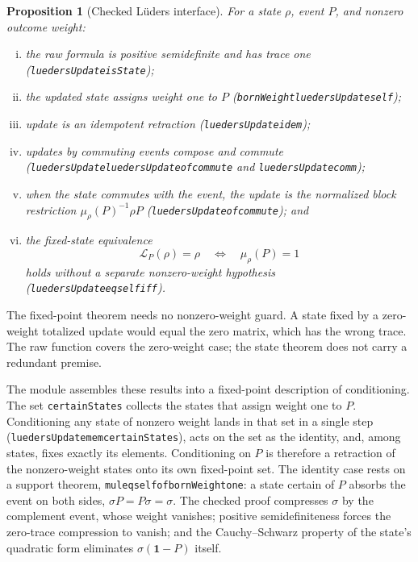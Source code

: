 \documentclass[11pt]{article}
\renewcommand{\_}{\textunderscore\allowbreak}
\newtheorem{proposition}{Proposition}
\theoremstyle{remark}
\newcommand{\one}{\mathbf 1}
\newcommand{\lued}{\mathcal L}
\begin{document}
\begin{proposition}[Checked L\"uders interface]
\label{prop:lueders}
For a state $\rho$, event $P$, and nonzero outcome weight:
\begin{enumerate}[(i)]
\item the raw formula is positive semidefinite and has trace one
(\texttt{luedersUpdate\_isState});
\item the updated state assigns weight one to $P$
(\texttt{bornWeight\_luedersUpdate\_self});
\item update is an idempotent retraction
(\texttt{luedersUpdate\_idem});
\item updates by commuting events compose and commute
(\texttt{luedersUpdate\_luedersUpdate\_of\_commute} and
\texttt{luedersUpdate\_comm});
\item when the state commutes with the event, the update is the normalized
block restriction $\mu_\rho(P)^{-1}\rho P$
(\texttt{luedersUpdate\_of\_commute}); and
\item the fixed-state equivalence
\[
  \lued_P(\rho)=\rho \quad\Longleftrightarrow\quad \mu_\rho(P)=1
\]
holds without a separate nonzero-weight hypothesis
(\texttt{luedersUpdate\_eq\_self\_iff}).
\end{enumerate}
\end{proposition}

The fixed-point theorem needs no nonzero-weight guard. A state fixed by a
zero-weight totalized update would equal the zero matrix, which has the wrong
trace. The raw function covers the zero-weight case; the state theorem
does not carry a redundant premise.

The module assembles these results into a fixed-point description of
conditioning. The set \texttt{certainStates} collects the states that assign
weight one to $P$. Conditioning any state of nonzero weight lands in that set
in a single step (\texttt{luedersUpdate\_mem\_certainStates}), acts on the
set as the identity, and, among states, fixes exactly its elements.
Conditioning on $P$ is therefore a retraction of the nonzero-weight states
onto its own fixed-point set. The identity case rests on a support theorem,
\texttt{mul\_eq\_self\_of\_bornWeight\_one}: a state certain of $P$ absorbs
the event on both sides, $\sigma P=P\sigma=\sigma$. The checked proof
compresses $\sigma$ by the complement event, whose weight vanishes; positive
semidefiniteness forces the zero-trace compression to vanish; and the
Cauchy--Schwarz property of the state's quadratic form eliminates
$\sigma(\one-P)$ itself.
\end{document}
